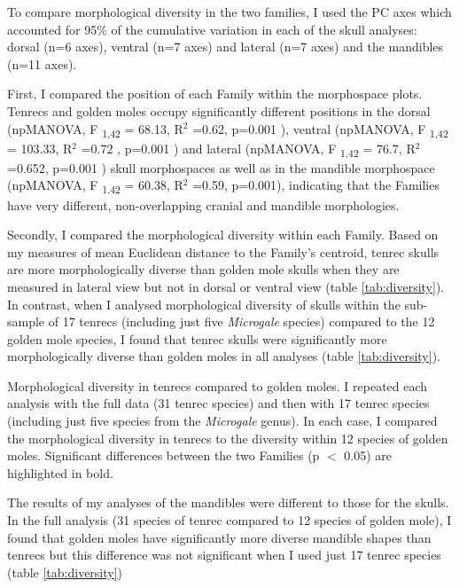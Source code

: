 	To compare morphological diversity in the two families, I used the PC axes which accounted for 95\% of the cumulative variation in each of the skull analyses: dorsal (n=6 axes), ventral (n=7 axes) and lateral (n=7 axes) and the mandibles (n=11 axes).
	
	First, I compared the position of each Family within the morphospace plots. Tenrecs and golden moles occupy significantly different positions in the dorsal (npMANOVA, F \textsubscript{1,42} = 68.13, R$^2$ =0.62, p=0.001 ), ventral (npMANOVA, F \textsubscript{1,42} = 103.33, R$^2$ =0.72 , p=0.001 ) and lateral (npMANOVA, F \textsubscript{1,42} = 76.7, R$^2$ =0.652, p=0.001 ) skull morphospaces as well as in the mandible morphospace (npMANOVA, F \textsubscript{1,42} = 60.38, R$^2$ =0.59, p=0.001),  indicating that the Families have very different, non-overlapping cranial and mandible morphologies. 
	

	Secondly, I compared the morphological diversity within each Family. Based on my measures of mean Euclidean distance to the Family's centroid, tenrec skulls are more morphologically diverse than golden mole skulls when they are measured in lateral view but not in dorsal or ventral view (table \ref{tab:diversity}). In contrast, when I analysed morphological diversity of skulls within the sub-sample of 17 tenrecs (including just five \textit{Microgale} species) compared to the 12 golden mole species, I found that tenrec skulls were significantly more morphologically diverse than golden moles in all analyses (table \ref{tab:diversity}).
	
	\begin{table}[!htbp]			
		\caption[Comparison of morphological diversity in tenrecs and golden moles.]
		{Morphological diversity in tenrecs compared to golden moles. I repeated each analysis with the full data (31 tenrec species) and then with 17 tenrec species (including just five species from the \textit{Microgale} genus). In each case, I compared the morphological diversity in tenrecs to the diversity within 12 species of golden moles. Significant differences between the two Families (p $<$ 0.05) are highlighted in bold.}
		 
		\label{tab:diversity}  
	\end{table}
	The results of my analyses of the mandibles were different to those for the skulls. In the full analysis (31 species of tenrec compared to 12 species of golden mole), I found that golden moles have significantly more diverse mandible shapes than tenrecs but this difference was not significant when I used just 17 tenrec species (table \ref{tab:diversity})
	

